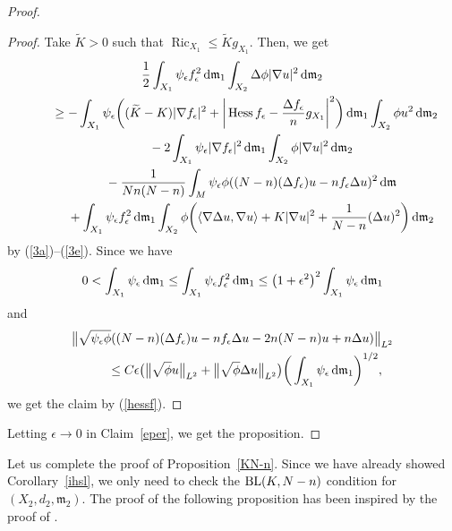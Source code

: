 \documentclass[10pt,a4paper]{amsart}
\numberwithin{equation}{section}
\theoremstyle{definition}
\newcommand{\Ric}{\operatorname{Ric}}
\newcommand{\Hess}{\operatorname{Hess}}
\newcommand{\mf}{\mathfrak{m}}
\newcommand{\BL}{{\rm BL}}
\begin{document}
\begin{proof}
\begin{proof}
Take $\widetilde{K}>0$ such that $\Ric_{X_1}\leq \widetilde{K} g_{X_1}$.
Then, we get
\begin{gather*}
\frac{1}{2}\int_{X_1}\psi_\epsilon f_\epsilon^2 \,{\rm d}\mf_1\int_{X_2}
\Delta \phi |\nabla u|^2\,{\rm d}\mf_2
\nonumber
\\ \qquad
{}\geq -\int_{X_1}\psi_\epsilon\bigg((\widetilde{K}-K)|\nabla f_\epsilon|^2 +\bigg|\Hess f_\epsilon-\frac{\Delta f_\epsilon}{n}g_{X_1}\bigg|^2\bigg)\,{\rm d}\mf_1\int_{X_2}\phi u^2\,{\rm d}\mf_2
\nonumber
\\  \qquad\quad
{}-2\int_{X_1} \psi_\epsilon |\nabla f_\epsilon|^2\,{\rm d}\mf_1\int_{X_2}\phi|\nabla u|^2\,{\rm d}\mf_2
\nonumber
\\ \qquad\quad
{}-\frac{1}{N n (N-n)}\int_M \psi_\epsilon \phi ((N-n)(\Delta f_\epsilon) u- n f_\epsilon \Delta u)^2\,{\rm d}\mf
\\  \qquad\quad
{}+\int_{X_1} \psi_\epsilon f_\epsilon^2\,{\rm d}\mf_1\int_{X_2} \phi \bigg(\langle\nabla \Delta u,\nabla u\rangle+K|\nabla u|^2+\frac{1}{N-n} (\Delta u)^2\bigg)\,{\rm d}\mf_2
\end{gather*}
by (\ref{3a})--(\ref{3e}).
Since we have
\[
0< \int_{X_1}\psi_\epsilon \,{\rm d}\mf_1\leq \int_{X_1}\psi_\epsilon f_\epsilon^2\,{\rm d}\mf_1\leq \big(1+\epsilon^2\big)^2\int_{X_1}\psi_\epsilon \,{\rm d}\mf_1
\]
and
\begin{gather*}
\big\|\sqrt{\psi_\epsilon \phi}((N-n)(\Delta f_\epsilon) u- n f_\epsilon \Delta u-2n(N-n)u+n\Delta u)\big\|_{L^2}
\\ \qquad
{}\leq C\epsilon \big(\big\|\sqrt{\phi} u\big\|_{L^2}+\big\|\sqrt{\phi} \Delta u\big\|_{L^2}\big)\bigg(\int_{X_1}\psi_\epsilon \,{\rm d}\mf_1\bigg)^{1/2},
\end{gather*}
we get the claim by (\ref{hessf}).
\end{proof}

Letting $\epsilon\to 0$ in Claim~\ref{eper}, we get the proposition.
\end{proof}

Let us complete the proof of Proposition~\ref{KN-n}.
Since we have already showed Corollary~\ref{ihsl}, we only need to check the $\BL(K,N-n)$ condition for $(X_2,d_2,\mf_2)$.
The proof of the following proposition has been inspired by the proof of \cite[Theorem~1.2]{Ket1}.
\end{document}

